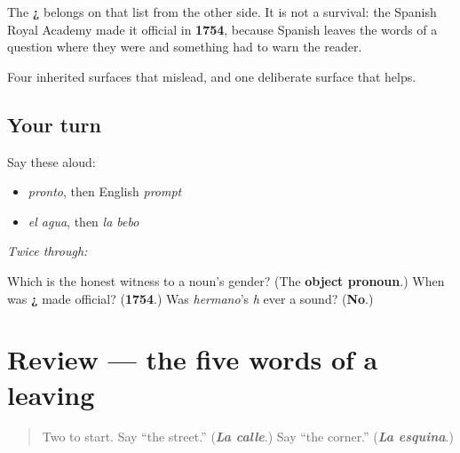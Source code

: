 \begin{grammarlens}[title={Grammar Lens: the mark that was designed, not inherited}]
The \textbf{¿} belongs on that list from the other side. It is not a survival: the Spanish Royal Academy made it official in \textbf{1754}, because Spanish leaves the words of a question where they were and something had to warn the reader.

Four inherited surfaces that mislead, and one deliberate surface that helps.
\end{grammarlens}

\subsection*{Your turn}
Say these aloud:

\begin{itemize}
\raggedright
  \item \emph{pronto}, then English \emph{prompt}
  \item \emph{el agua}, then \emph{la bebo}
\end{itemize}

\emph{Twice through:}

\begin{tcolorbox}[breakable,colback=teal!4,colframe=teal!35!black,title={Before you move on}]
Which is the honest witness to a noun's gender? (The \textbf{object pronoun}.) When was \textbf{¿} made official? (\textbf{1754}.) Was \emph{hermano}'s \emph{h} ever a sound? (\textbf{No}.)
\end{tcolorbox}
\section[(review)]{Review — the five words of a leaving}

\label{lesson:ES-C319-repaso-salir}



\begin{quote}
Two to start. Say \textquotedblleft{}the street.\textquotedblright{} (\emph{\textbf{La calle}}.) Say \textquotedblleft{}the corner.\textquotedblright{} (\emph{\textbf{La esquina}}.)
\end{quote}

